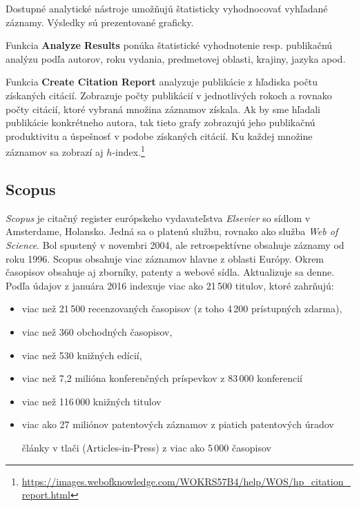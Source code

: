 Dostupné analytické nástroje umožňujú štatisticky vyhodnocovať vyhľadané
záznamy. Výsledky sú prezentované graficky.

Funkcia \textbf{Analyze Results} ponúka štatistické vyhodnotenie
resp. publikačnú analýzu podľa autorov, roku vydania, predmetovej oblasti,
krajiny, jazyka apod.

Funkcia \textbf{Create Citation Report} analyzuje publikácie z hľadiska počtu
získaných citácií. Zobrazuje počty publikácií v jednotlivých rokoch a rovnako
počty citácií, ktoré vybraná množina záznamov získala. Ak by sme hľadali
publikácie konkrétneho autora, tak tieto grafy zobrazujú jeho publikačnú
produktivitu a úspešnosť v podobe získaných citácií. Ku každej množine záznamov
sa zobrazí aj
$h$-index.\footnote{\url{https://images.webofknowledge.com/WOKRS57B4/help/WOS/hp_citation_report.html}}


\subsection{Scopus}

\emph{Scopus} je citačný register európskeho vydavateľstva \emph{Elsevier} so
sídlom v Amsterdame, Holansko. Jedná sa o platenú službu, rovnako ako služba
\emph{Web of Science}. Bol spustený v novembri 2004, ale retrospektívne obsahuje
záznamy od roku 1996. Scopus obsahuje viac záznamov hlavne z oblasti
Európy. Okrem časopisov obsahuje aj zborníky, patenty a webové
sídla. Aktualizuje sa denne. Podľa údajov z januára 2016 indexuje viac ako
21\,500 titulov, ktoré zahrňujú:

\begin{itemize}

\item viac než 21\,500 recenzovaných časopisov (z toho 4\,200 prístupných zdarma),
 
\item viac než 360 obchodných časopisov,

\item viac než 530 knižných edícií,

\item viac než 7,2 milióna konferenčných príspevkov z 83\,000 konferencií

\item viac než 116\,000 knižných titulov 

\item viac ako 27 miliónov patentových záznamov z piatich patentových úradov

články v tlači (Articles-in-Press) z viac ako 5\,000 časopisov

\end{itemize}

